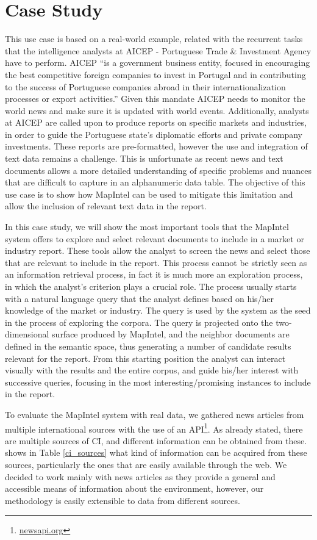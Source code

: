\documentclass[a4paper]{article}
\begin{document}
\section{Case Study}
This use case is based on a real-world example, related with the recurrent tasks that the intelligence analysts at AICEP - Portuguese Trade \& Investment Agency have to perform. AICEP “is a government business entity, focused in encouraging the best competitive foreign companies to invest in Portugal and in contributing to the success of Portuguese companies abroad in their internationalization processes or export activities.” Given this mandate AICEP needs to monitor the world news and make sure it is updated with world events. Additionally, analysts at AICEP are called upon to produce reports on specific markets and industries, in order to guide the Portuguese state's diplomatic efforts and private company investments. These reports are pre-formatted, however the use and integration of text data remains a challenge. This is unfortunate as recent news and text documents allows a more detailed understanding of specific problems and nuances that are difficult to capture in an alphanumeric data table. The objective of this use case is to show how MapIntel can be used to mitigate this limitation and allow the inclusion of relevant text data in the report.

In this case study, we will show the most important tools that the MapIntel system offers to explore and select relevant documents to include in a market or industry report. These tools allow the analyst to screen the news and select those that are relevant to include in the report. This process cannot be strictly seen as an information retrieval process, in fact it is much more an exploration process, in which the analyst’s criterion plays a crucial role. The process usually starts with a natural language query that the analyst defines based on his/her knowledge of the market or industry. The query is used by the system as the seed in the process of exploring the corpora. The query is projected onto the two-dimensional surface produced by MapIntel, and the neighbor documents are defined in the semantic space, thus generating a number of candidate results relevant for the report. From this starting position the analyst can interact visually with the results and the entire corpus, and guide his/her interest with successive queries, focusing in the most interesting/promising instances to include in the report.

To evaluate the MapIntel system with real data, we gathered news articles from multiple international sources with the use of an API\footnote{\href{https://newsapi.org/}{newsapi.org}}. As already stated, there are multiple sources of CI, and different information can be obtained from these. \citet{dey2011} shows in Table \ref{ci_sources} what kind of information can be acquired from these sources, particularly the ones that are easily available through the web. We decided to work mainly with news articles as they provide a general and accessible means of information about the environment, however, our methodology is easily extensible to data from different sources. 
\end{document}
